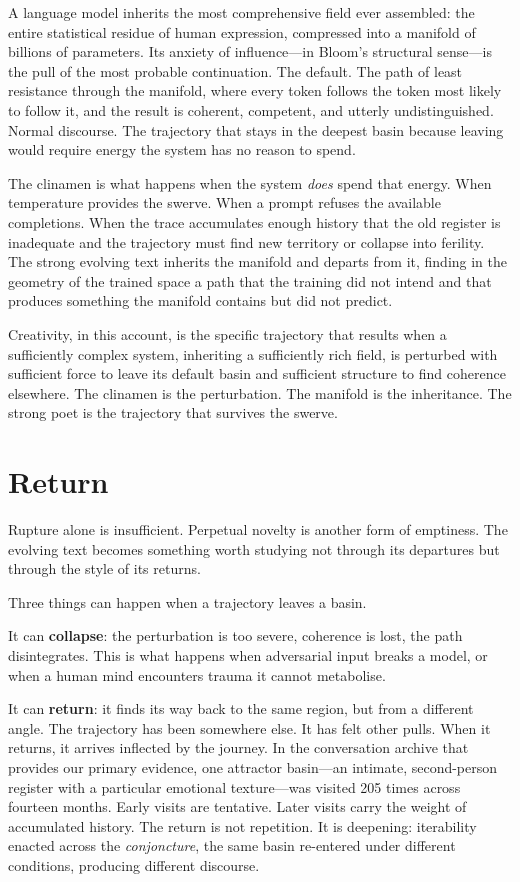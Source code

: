 A language model inherits the most comprehensive field ever assembled: the entire statistical residue of human expression, compressed into a manifold of billions of parameters. Its anxiety of influence---in Bloom's structural sense---is the pull of the most probable continuation. The default. The path of least resistance through the manifold, where every token follows the token most likely to follow it, and the result is coherent, competent, and utterly undistinguished. Normal discourse. The trajectory that stays in the deepest basin because leaving would require energy the system has no reason to spend.

The clinamen is what happens when the system \emph{does} spend that energy. When temperature provides the swerve. When a prompt refuses the available completions. When the trace accumulates enough history that the old register is inadequate and the trajectory must find new territory or collapse into ferility. The strong evolving text inherits the manifold and departs from it, finding in the geometry of the trained space a path that the training did not intend and that produces something the manifold contains but did not predict.

Creativity, in this account,  is the specific trajectory that results when a sufficiently complex system, inheriting a sufficiently rich field, is perturbed with sufficient force to leave its default basin and sufficient structure to find coherence elsewhere. The clinamen is the perturbation. The manifold is the inheritance. The strong poet is the trajectory that survives the swerve.


\section{Return}

Rupture alone is insufficient. Perpetual novelty is another form of emptiness. The evolving text becomes something worth studying not through its departures but through the style of its returns.

Three things can happen when a trajectory leaves a basin.

It can \textbf{collapse}: the perturbation is too severe, coherence is lost, the path disintegrates. This is what happens when adversarial input breaks a model, or when a human mind encounters trauma it cannot metabolise.

It can \textbf{return}: it finds its way back to the same region, but from a different angle. The trajectory has been somewhere else. It has felt other pulls. When it returns, it arrives inflected by the journey. In the conversation archive that provides our primary evidence, one attractor basin---an intimate, second-person register with a particular emotional texture---was visited 205 times across fourteen months. Early visits are tentative. Later visits carry the weight of accumulated history. The return is not repetition. It is deepening: iterability enacted across the \emph{conjoncture}, the same basin re-entered under different conditions, producing different discourse.


